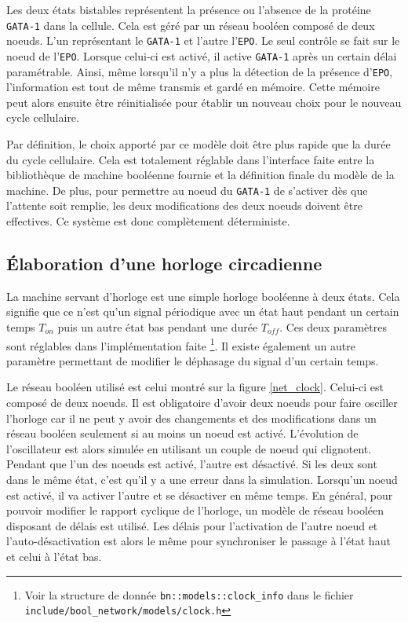 \documentclass[11pt, a4paper]{article}
\begin{document}
Les deux états bistables représentent la présence ou l'absence de la protéine
\texttt{GATA-1} dans la cellule. Cela est géré par un réseau booléen composé de
deux noeuds. L'un représentant le \texttt{GATA-1} et l'autre l'\texttt{EPO}. Le
seul contrôle se fait sur le noeud de l'\texttt{EPO}. Lorsque celui-ci est
activé, il active \texttt{GATA-1} après un certain délai paramétrable. Ainsi,
même lorsqu'il n'y a plus la détection de la présence d'\texttt{EPO},
l'information est tout de même transmis et gardé en mémoire. Cette mémoire peut
alors ensuite être réinitialisée pour établir un nouveau choix pour le nouveau
cycle cellulaire. %

Par définition, le choix apporté par ce modèle doit être plus rapide que la dur\'ee
du cycle cellulaire. Cela est totalement réglable dans l'interface faite entre
la bibliothèque de machine booléenne fournie et la définition finale du modèle
de la machine. De plus, pour permettre au noeud du \texttt{GATA-1} de s'activer
dès que l'attente soit remplie, les deux modifications des deux noeuds doivent
être effectives. Ce système est donc complètement déterministe.

\subsection{Élaboration d'une horloge circadienne}
La machine servant d'horloge est une simple horloge booléenne à deux états.
Cela signifie que ce n'est qu'un signal périodique avec un état haut pendant un
certain temps $T_{on}$ puis un autre état bas pendant une durée $T_{off}$.
Ces deux paramètres sont réglables dans l'implémentation faite \footnote{Voir
    la structure de donnée \texttt{bn::models::clock\_info} dans le fichier
\texttt{include/bool\_network/models/clock.h}}. Il existe également un autre
paramètre permettant de modifier le déphasage du signal d'un certain temps.

Le réseau booléen utilisé est celui montré sur la figure \ref{net_clock}.
Celui-ci est composé de deux noeuds. Il est obligatoire d'avoir deux noeuds
pour faire osciller l'horloge car il ne peut y avoir des changements et des
modifications dans un réseau booléen seulement si au moins un noeud est activé.
L'évolution de l'oscillateur est alors simulée en utilisant un couple de noeud
qui clignotent. Pendant que l'un des noeuds est activé, l'autre est désactivé.
Si les deux sont dans le même état, c'est qu'il y a une erreur dans la
simulation. Lorsqu'un noeud est activé, il va activer l'autre et se désactiver
en même temps. En général, pour pouvoir modifier le rapport cyclique de
l'horloge, un modèle de réseau booléen disposant de délais est utilisé. Les
délais pour l'activation de l'autre noeud et l'auto-désactivation est alors le
même pour synchroniser le passage à l'état haut et celui à l'état bas.
\end{document}
